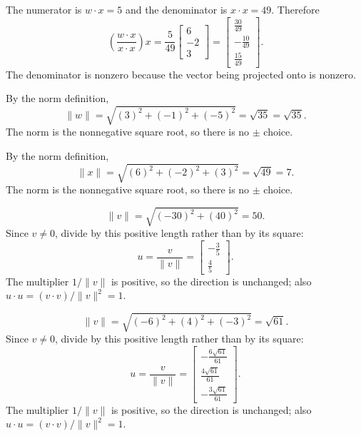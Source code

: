 The numerator is $w\cdot x=5$ and the denominator is $x\cdot x=49$. Therefore
\[\left(\frac{w\cdot x}{x\cdot x}\right)x=\frac{5}{49}\left[\begin{array}{r}6\\-2\\3\end{array}\right]=\left[\begin{array}{r}\frac{30}{49}\\- \frac{10}{49}\\\frac{15}{49}\end{array}\right].\]
The denominator is nonzero because the vector being projected onto is nonzero.

By the norm definition,
\[\|w\|=\sqrt{(3)^2+(-1)^2+(-5)^2}=\sqrt{35}=\sqrt{35}.\]
The norm is the nonnegative square root, so there is no $\pm$ choice.

By the norm definition,
\[\|x\|=\sqrt{(6)^2+(-2)^2+(3)^2}=\sqrt{49}=7.\]
The norm is the nonnegative square root, so there is no $\pm$ choice.

\[\|v\|=\sqrt{(-30)^2+(40)^2}=50.\]
Since $v\ne0$, divide by this positive length rather than by its square:
\[u=\frac{v}{\|v\|}=\left[\begin{array}{r}- \frac{3}{5}\\\frac{4}{5}\end{array}\right].\]
The multiplier $1/\|v\|$ is positive, so the direction is unchanged; also $u\cdot u=(v\cdot v)/\|v\|^2=1$.

\[\|v\|=\sqrt{(-6)^2+(4)^2+(-3)^2}=\sqrt{61}.\]
Since $v\ne0$, divide by this positive length rather than by its square:
\[u=\frac{v}{\|v\|}=\left[\begin{array}{r}- \frac{6 \sqrt{61}}{61}\\\frac{4 \sqrt{61}}{61}\\- \frac{3 \sqrt{61}}{61}\end{array}\right].\]
The multiplier $1/\|v\|$ is positive, so the direction is unchanged; also $u\cdot u=(v\cdot v)/\|v\|^2=1$.


